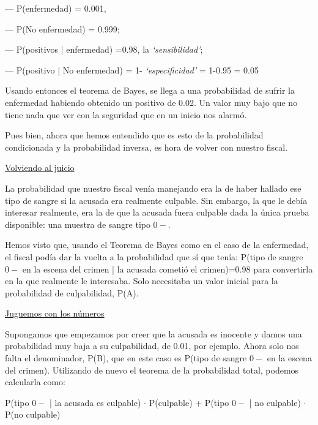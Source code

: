 \begin{myexampleblock}
\begin{small}
\vspace{2mm} --- P(enfermedad) = 0.001, 

--- P(No enfermedad) = 0.999; 

--- P(positivos | enfermedad) =0.98, la \emph{`sensibilidad’}; 

--- P(positivo | No enfermedad) = 1- \emph{`especificidad’} = 1-0.95 = 0.05 

\vspace{2mm} Usando entonces el teorema de Bayes, se llega a una probabilidad de sufrir la enfermedad habiendo obtenido un positivo de 0.02. Un valor muy bajo que no tiene nada que ver con la seguridad que en un inicio nos alarmó.

\vspace{2mm} Pues bien, ahora que hemos entendido que es esto de la probabilidad condicionada y la probabilidad inversa, es hora de volver con nuestro fiscal.

\vspace{2mm} \underline{Volviendo al juicio}

\vspace{2mm} La probabilidad que nuestro fiscal venía manejando era la de haber hallado ese tipo de sangre si la acusada era realmente culpable. Sin embargo, la que le debía interesar realmente, era la de que la acusada fuera culpable dada la única prueba disponible: una muestra de sangre tipo $0-$.


\vspace{2mm} Hemos visto que, usando el Teorema de Bayes como en el caso de la enfermedad, el fiscal podía dar la vuelta a la probabilidad que sí que tenía: P(tipo de sangre $0-$ en la escena del crimen | la acusada cometió el crimen)=0.98 para convertirla en la que realmente le interesaba. Solo necesitaba un valor inicial para la probabilidad de culpabilidad, P(A).



\vspace{2mm} \underline{Juguemos  con los números}



\vspace{2mm} Supongamos que empezamos por creer que la acusada es inocente y damos una probabilidad muy baja a su culpabilidad, de 0.01, por ejemplo. Ahora solo nos falta el denominador, P(B), que en este caso es P(tipo de sangre $0-$ en la escena del crimen). Utilizando de nuevo el teorema de la probabilidad total, podemos calcularla como:

\vspace{2mm} P(tipo $0-$ | la acusada es culpable) $\cdot$ P(culpable) + P(tipo $0-$ | no culpable) $\cdot$ P(no culpable)


\end{small}
\end{myexampleblock}
